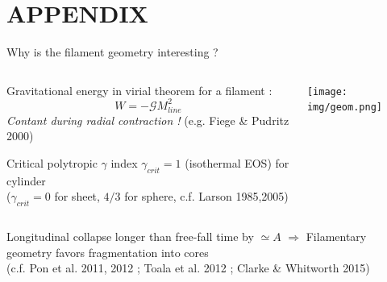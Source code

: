 \section{APPENDIX}
\begin{frame}{Why is the filament geometry interesting ?}
\begin{columns}
\begin{column}{.6\linewidth}
\begin{block}{Gravitational energy}
in virial theorem for a filament : 
$$W=-\mathcal{G}M_{line}^2$$
\textit{Contant during radial contraction !} (e.g. Fiege \& Pudritz 2000)
\end{block}
\begin{block}{Critical polytropic $\gamma$ index}
$\gamma_{crit}=1$ (isothermal EOS) for cylinder\\
($\gamma_{crit}=0$ for sheet, $4/3$ for sphere, c.f. Larson 1985,2005)
\end{block}
\end{column}
\begin{column}{.4\linewidth}
\texttt{[image: img/geom.png]}
\end{column}
\end{columns}
\begin{block}{Longitudinal collapse longer than free-fall time by $\simeq A$}
$\Rightarrow$ Filamentary geometry favors fragmentation into cores\\
(c.f. Pon et al. 2011, 2012 ; Toala et al. 2012 ; Clarke \& Whitworth 2015)\end{block}
\end{frame}


